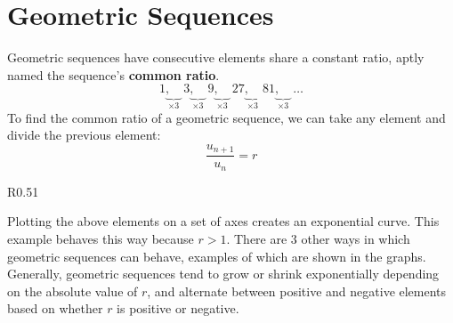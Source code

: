 \documentclass[../../main.tex]{subfiles}
\begin{document}
\section{Geometric Sequences}

Geometric sequences have consecutive elements share a constant ratio, aptly named the sequence's \textbf{common ratio}.
\[
    1\underbrace{,\quad}_{\times3}
    3\underbrace{,\quad}_{\times3}
    9\underbrace{,\quad}_{\times3}
    27\underbrace{,\quad}_{\times3}
    81\underbrace{,\quad}_{\times3}
    \ldots
\]
To find the common ratio of a geometric sequence, we can take any element and divide the previous element:
\[
    \frac{u_{n+1}}{u_n} = r
\]

\begin{center}
\end{center}

\begin{wrapfigure}{R}{0.51\textwidth}
    \centering
\end{wrapfigure}

Plotting the above elements on a set of axes creates an exponential curve. This example behaves this way because \(r > 1\). There are 3 other ways in which geometric sequences can behave, examples of which are shown in the graphs. Generally, geometric sequences tend to grow or shrink exponentially depending on the absolute value of $r$, and alternate between positive and negative elements based on whether $r$ is positive or negative.
\end{document}
